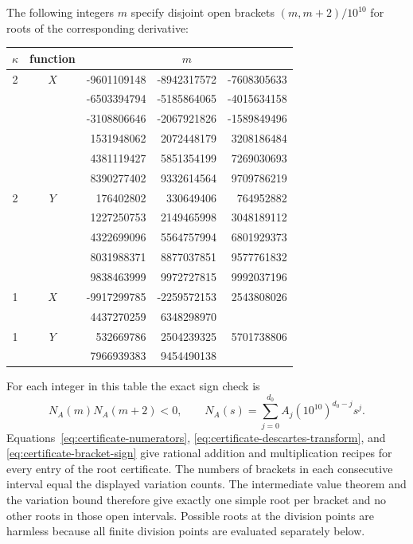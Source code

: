The following integers $m$ specify disjoint open brackets
$(m,m+2)/10^{10}$ for roots of the corresponding derivative:
\begin{center}
\begin{tabular}{ccrrr}
\toprule
$\kappa$&function&\multicolumn{3}{c}{$m$}\\
\midrule
2&$X$&-9601109148&-8942317572&-7608305633\\
&&-6503394794&-5185864065&-4015634158\\
&&-3108806646&-2067921826&-1589849496\\
&&1531948062&2072448179&3208186484\\
&&4381119427&5851354199&7269030693\\
&&8390277402&9332614564&9709786219\\
\midrule
2&$Y$&176402802&330649406&764952882\\
&&1227250753&2149465998&3048189112\\
&&4322699096&5564757994&6801929373\\
&&8031988371&8877037851&9577761832\\
&&9838463999&9972727815&9992037196\\
\midrule
1&$X$&-9917299785&-2259572153&2543808026\\
&&4437270259&6348298970&\\
\midrule
1&$Y$&532669786&2504239325&5701738806\\
&&7966939383&9454490138&\\
\bottomrule
\end{tabular}
\end{center}
For each integer in this table the exact sign check is
\begin{equation}\label{eq:certificate-bracket-sign}
 N_A(m)N_A(m+2)<0,\qquad
 N_A(s)=\sum_{j=0}^{d_0}A_j(10^{10})^{d_0-j}s^j.
\end{equation}
Equations~\eqref{eq:certificate-numerators},
\eqref{eq:certificate-descartes-transform}, and
\eqref{eq:certificate-bracket-sign} give rational addition and
multiplication recipes for every entry of the root certificate.
The numbers of brackets in each consecutive interval equal the displayed
variation counts.  The intermediate value theorem and the variation
bound therefore give exactly one simple root per bracket and no other
roots in those open intervals.  Possible roots at the division points
are harmless because all finite division points are evaluated separately
below.

